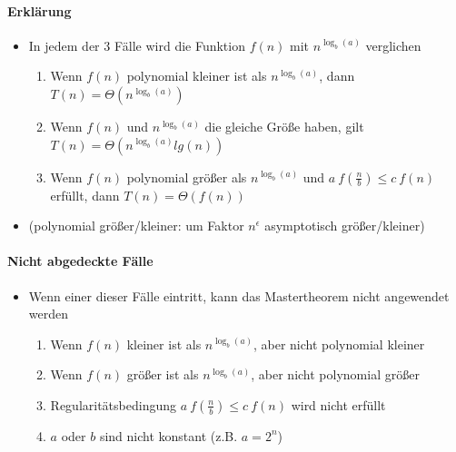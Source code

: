 \documentclass[
    ngerman,
    color=3b,
    dark_mode,
    load_common, %
    summary,
    boxarc,
]{rubos-tuda-template}
\begin{document}
\paragraph{Erklärung}\mbox{}
\begin{itemize}
    \item In jedem der 3 Fälle wird die Funktion $f(n)$ mit $n^{\log_b(a)}$ verglichen
          \begin{enumerate}
              \item Wenn $f(n)$ polynomial kleiner ist als $n^{\log_b(a)}$, dann $T(n) = \Theta(n^{\log_b(a)})$
              \item Wenn $f(n)$ und $n^{\log_b(a)}$ die gleiche Grö\ss{}e haben, gilt $T(n) = \Theta(n^{\log_b (a)} lg(n))$
              \item Wenn $f(n)$ polynomial grö\ss{}er als $n^{\log_b(a)}$ und $a~f(\frac{n}{b}) \leq c~f(n)$ erfüllt, dann $T(n) = \Theta(f(n))$
          \end{enumerate}
    \item (polynomial grö\ss{}er/kleiner: um Faktor $n^\epsilon$ asymptotisch grö\ss{}er/kleiner)
\end{itemize}

\paragraph{Nicht abgedeckte Fälle}\mbox{}
\begin{itemize}
    \item Wenn einer dieser Fälle eintritt, kann das Mastertheorem nicht angewendet werden
          \begin{enumerate}
              \item Wenn $f(n)$ kleiner ist als $n^{\log_b(a)}$, aber nicht polynomial kleiner
              \item Wenn $f(n)$ grö\ss{}er ist als $n^{\log_b(a)}$, aber nicht polynomial grö\ss{}er
              \item Regularitätsbedingung $a~f(\frac{n}{b}) \leq c~f(n)$ wird nicht erfüllt
              \item $a$ oder $b$ sind nicht konstant (z.B. $a=2^n$)
          \end{enumerate}
\end{itemize}
\clearpage
\end{document}
